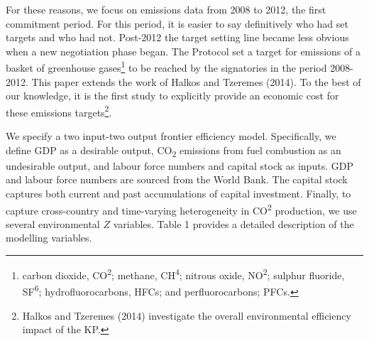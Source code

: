 \documentclass[
  10pt,
]{article}
\begin{document}
For these reasons, we focus on emissions data from 2008 to 2012, the
first commitment period. For this period, it is easier to say
definitively who had set targets and who had not. Post-2012 the target setting line became less obvious when a new negotiation phase began. The Protocol set a target
for emissions of a basket of greenhouse gases\footnote{carbon dioxide,
  CO\textsuperscript{2}; methane, CH\textsuperscript{4}; nitrous oxide,
  NO\textsuperscript{2}; sulphur fluoride, SF\textsuperscript{6};
  hydrofluorocarbons, HFCs; and perfluorocarbons; PFCs.} to be reached
by the signatories in the period 2008-2012. This paper extends the work
of Halkos and Tzeremes (2014). To the best of our knowledge, it is the
first study to explicitly provide an economic cost for these emissions
targets\footnote{Halkos and Tzeremes (2014) investigate the overall
  environmental efficiency impact of the KP.}.

We specify a two input-two output frontier efficiency model.
Specifically, we define GDP as a desirable output, CO\textsubscript{2}
emissions from fuel combustion as an undesirable output, and labour
force numbers and capital stock as inputs. GDP and labour force numbers
are sourced from the World Bank. The capital stock captures both current
and past accumulations of capital investment. Finally, to capture
cross-country and time-varying heterogeneity in CO\textsuperscript{2}
production, we use several environmental \(Z\) variables. Table 1
provides a detailed description of the modelling variables.

\begingroup\fontsize{8}{10}\selectfont
\end{document}
